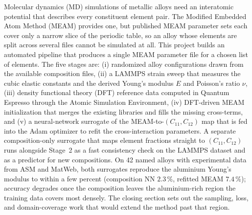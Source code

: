 \begin{boxedabstract}
\small
Molecular dynamics (MD) simulations of metallic alloys need an interatomic
potential that describes every constituent element pair. The Modified
Embedded Atom Method (MEAM) provides one, but published MEAM parameter sets
each cover only a narrow slice of the periodic table, so an alloy whose
elements are split across several files cannot be simulated at all. This
project builds an automated pipeline that produces a single MEAM parameter
file for a chosen list of elements. The five stages are: (i) randomized
alloy configurations drawn from the available composition files, (ii) a
LAMMPS strain sweep that measures the cubic elastic constants and the derived
Young's modulus $E$ and Poisson's ratio $\nu$, (iii) density functional
theory (DFT) reference data computed in Quantum Espresso through the Atomic
Simulation Environment, (iv) DFT-driven MEAM initialization that merges the
existing libraries and fills the missing cross-terms, and (v) a neural-network
surrogate of the MEAM-to-$(C_{11},C_{12})$ map that is fed into the
Adam optimizer to refit the cross-interaction parameters. A separate composition-only
surrogate that maps element fractions straight to $(C_{11},C_{12})$ runs
alongside Stage~2 as a fast consistency check on the LAMMPS dataset and as a predictor for new compositions. On
42 named alloys with experimental data from ASM and MatWeb, both surrogates
reproduce the aluminium Young's modulus to within a few percent (composition
NN $2.3\,\%$, refitted MEAM $7.4\,\%$); accuracy degrades once the
composition leaves the aluminium-rich region the training data covers most
densely. The closing section sets out the sampling, loss, and
domain-coverage work that would extend the method past that region.
\vspace{0.5em}
\end{boxedabstract}
